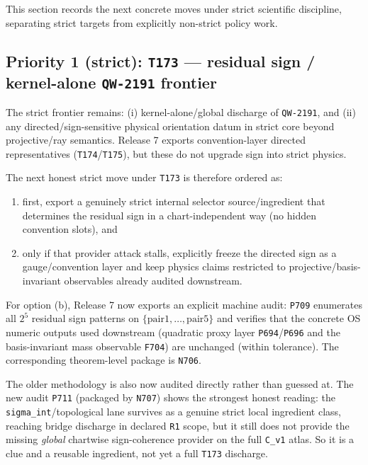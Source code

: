 \documentclass[11pt,a4paper]{article}
\begin{document}
This section records the next concrete moves under strict scientific discipline, separating strict targets from explicitly non-strict policy work.

\subsection*{Priority 1 (strict): \texttt{T173} --- residual sign / kernel-alone \texttt{QW-2191} frontier}

The strict frontier remains: (i) kernel-alone/global discharge of \texttt{QW-2191}, and (ii) any directed/sign-sensitive physical orientation datum in strict core beyond projective/ray semantics.
Release 7 exports convention-layer directed representatives (\texttt{T174}/\texttt{T175}), but these do not upgrade sign into strict physics.

The next honest strict move under \texttt{T173} is therefore ordered as:
\begin{enumerate}[label=(\alph*)]
  \item first, export a genuinely strict internal selector source/ingredient that determines the residual sign in a chart-independent way (no hidden convention slots), and
  \item only if that provider attack stalls, explicitly freeze the directed sign as a gauge/convention layer and keep physics claims restricted to projective/basis-invariant observables already audited downstream.
\end{enumerate}

For option (b), Release 7 now exports an explicit machine audit: \texttt{P709} enumerates all $2^5$ residual sign patterns on $\{\mathrm{pair1},\dots,\mathrm{pair5}\}$ and verifies that the concrete OS numeric outputs used downstream (quadratic proxy layer \texttt{P694}/\texttt{P696} and the basis-invariant mass observable \texttt{F704}) are unchanged (within tolerance). The corresponding theorem-level package is \texttt{N706}.

The older methodology is also now audited directly rather than guessed at. The new audit \texttt{P711} (packaged by
\texttt{N707}) shows the strongest honest reading: the \texttt{sigma\_int}/topological lane survives as a genuine strict local
ingredient class, reaching bridge discharge in declared \texttt{R1} scope, but it still does not provide the missing
\emph{global} chartwise sign-coherence provider on the full \texttt{C\_v1} atlas. So it is a clue and a reusable ingredient,
not yet a full \texttt{T173} discharge.
\end{document}
